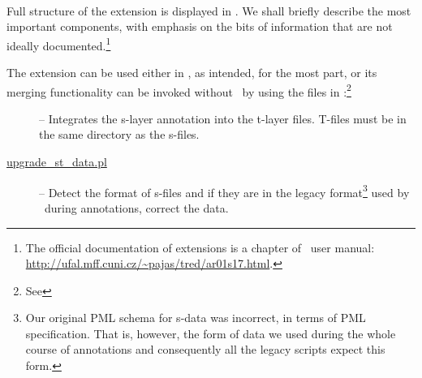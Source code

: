 \todo\ 

Full structure of the extension is displayed in . We shall briefly describe the most important components, with emphasis on the bits of information that are not ideally documented.\footnote{The official documentation of extensions is a chapter of \tred\ user manual: \url{http://ufal.mff.cuni.cz/~pajas/tred/ar01s17.html}.}

The extension can be used either in \tred, as intended, for the most part, or its merging functionality can be invoked without \tred\ by using the files in :\footnote{See }
\begin{description}
\item [] -- Integrates the s-layer annotation into the t-layer files. T-files must be in the same directory as the s-files. 
\item [\url{upgrade_st_data.pl}] -- Detect the format of s-files and if they are in the legacy format\footnote{%
Our original PML schema for s-data was incorrect, in terms of PML specification. That is, however, the form of data we used during the whole course of annotations and consequently all the legacy scripts expect this form.}%
 used by \seman\ during annotations, correct the data. 
\end{description}




